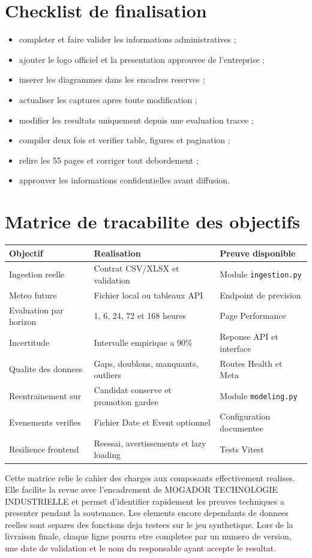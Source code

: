 \clearpage
\section{Checklist de finalisation}
\begin{itemize}[leftmargin=*]
\item completer et faire valider les informations administratives ;
\item ajouter le logo officiel et la presentation approuvee de l'entreprise ;
\item inserer les diagrammes dans les encadres reserves ;
\item actualiser les captures apres toute modification ;
\item modifier les resultats uniquement depuis une evaluation tracee ;
\item compiler deux fois et verifier table, figures et pagination ;
\item relire les 55 pages et corriger tout debordement ;
\item approuver les informations confidentielles avant diffusion.
\end{itemize}

\clearpage
\section{Matrice de tracabilite des objectifs}
\begin{longtable}{p{4.3cm}p{5cm}p{4.2cm}}
\toprule
Objectif & Realisation & Preuve disponible\\
\midrule
Ingestion reelle & Contrat CSV/XLSX et validation & Module \texttt{ingestion.py}\\
Meteo future & Fichier local ou tableaux API & Endpoint de prevision\\
Evaluation par horizon & 1, 6, 24, 72 et 168 heures & Page Performance\\
Incertitude & Intervalle empirique a 90\% & Reponse API et interface\\
Qualite des donnees & Gaps, doublons, manquants, outliers & Routes Health et Meta\\
Reentrainement sur & Candidat conserve et promotion gardee & Module \texttt{modeling.py}\\
Evenements verifies & Fichier Date et Event optionnel & Configuration documentee\\
Resilience frontend & Reessai, avertissements et lazy loading & Tests Vitest\\
\bottomrule
\end{longtable}

Cette matrice relie le cahier des charges aux composants effectivement realises. Elle facilite la revue avec l'encadrement de MOGADOR TECHNOLOGIE INDUSTRIELLE et permet d'identifier rapidement les preuves techniques a presenter pendant la soutenance. Les elements encore dependants de donnees reelles sont separes des fonctions deja testees sur le jeu synthetique. Lors de la livraison finale, chaque ligne pourra etre completee par un numero de version, une date de validation et le nom du responsable ayant accepte le resultat.
